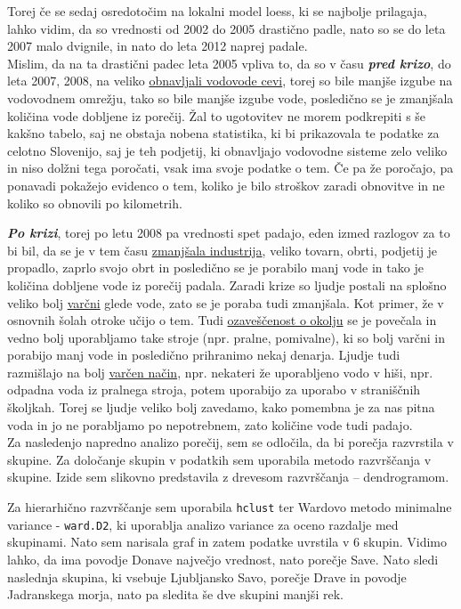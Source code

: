 \documentclass[11pt,a4paper]{article}
\begin{document}
Torej če se sedaj osredotočim na lokalni model loess, ki se najbolje prilagaja, lahko vidim, da so vrednosti od 2002 do 2005 drastično padle, nato so se do leta 2007 malo dvignile, in nato do leta 2012 naprej padale.\\
Mislim, da na ta drastični padec leta 2005 vpliva to, da so v času \textbf{\emph{pred krizo}}, do leta 2007, 2008, na veliko \underline{obnavljali vodovode cevi}, torej so bile manjše izgube na vodovodnem omrežju, tako so bile manjše izgube vode, posledično se je zmanjšala količina vode dobljene iz porečij. Žal to ugotovitev ne morem podkrepiti s še kakšno tabelo, saj ne obstaja nobena statistika, ki bi prikazovala te podatke za celotno Slovenijo, saj je teh podjetij, ki obnavljajo vodovodne sisteme zelo veliko in niso dolžni tega poročati, vsak ima svoje podatke o tem. Če pa že poročajo, pa ponavadi pokažejo evidenco o tem, koliko je bilo stroškov zaradi obnovitve in ne koliko so obnovili po kilometrih.

\textbf{\emph{Po krizi}}, torej po letu 2008 pa vrednosti spet padajo, eden izmed razlogov za to bi bil, da se je v tem času \underline{zmanjšala industrija}, veliko tovarn, obrti, podjetij je propadlo, zaprlo svojo obrt in  posledično se je porabilo manj vode in tako je količina dobljene vode iz porečij padala. Zaradi krize so ljudje postali na splošno veliko bolj \underline{varčni} glede vode, zato se je poraba tudi zmanjšala. Kot primer, že v osnovnih šolah otroke učijo o tem. Tudi \underline{ozaveščenost o okolju} se je povečala in vedno bolj uporabljamo take stroje (npr. pralne, pomivalne), ki so bolj varčni in porabijo manj vode in posledično prihranimo nekaj denarja. Ljudje tudi razmišlajo na bolj \underline{varčen način}, npr. nekateri že uporabljeno vodo v hiši, npr. odpadna voda iz pralnega stroja, potem uporabijo za uporabo v straniščnih školjkah. Torej se ljudje veliko bolj zavedamo, kako pomembna je za nas pitna voda in jo ne porabljamo po nepotrebnem, zato količine vode tudi padajo.\\


Za nasledenjo napredno analizo porečij, sem se odločila, da bi porečja razvrstila v skupine. Za določanje skupin v podatkih sem uporabila metodo razvrščanja v skupine. Izide sem slikovno predstavila z drevesom razvrščanja – dendrogramom.


Za hierarhično razvrščanje sem uporabila \verb|hclust| ter Wardovo metodo minimalne variance - \verb|ward.D2|, ki uporablja analizo variance za oceno razdalje med skupinami. Nato sem narisala graf in zatem podatke uvrstila v 6 skupin. Vidimo lahko, da ima povodje Donave največjo vrednost, nato porečje Save. Nato sledi naslednja skupina, ki vsebuje Ljubljansko Savo, porečje Drave in povodje Jadranskega morja, nato pa sledita še dve skupini manjši rek.
\end{document}
